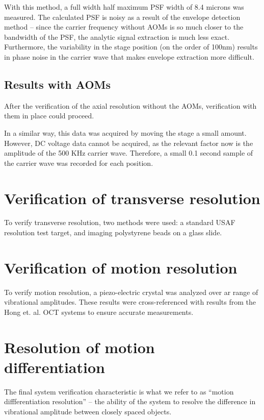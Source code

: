 With this method, a full width half maximum PSF width of 8.4 microns was measured. The calculated PSF is noisy as a result of the envelope detection method -- since the carrier frequency without AOMs is so much closer to the bandwidth of the PSF, the analytic signal extraction is much less exact. Furthermore, the variability in the stage position (on the order of 100nm) results in phase noise in the carrier wave that makes envelope extraction more difficult.

\subsection{Results with AOMs}

After the verification of the axial resolution without the AOMs, verification with them in place could proceed.

In a similar way, this data was acquired by moving the stage a small amount. However, DC voltage data cannot be acquired, as the relevant factor now is the amplitude of the 500 KHz carrier wave. Therefore, a small 0.1 second sample of the carrier wave was recorded for each position.

\section{Verification of transverse resolution}

To verify transverse resolution, two methods were used: a standard USAF resolution test target, and imaging polystyrene beads on a glass slide.

\section{Verification of motion resolution}

To verify motion resolution, a piezo-electric crystal was analyzed over ar range of vibrational amplitudes. These results were cross-referenced with results from the Hong et. al. OCT systems to ensure accurate measurements.

\section{Resolution of motion differentiation}

The final system verification characteristic is what we refer to as ``motion diffferentiation resolution'' -- the ability of the system to resolve the difference in vibrational amplitude between closely spaced objects.